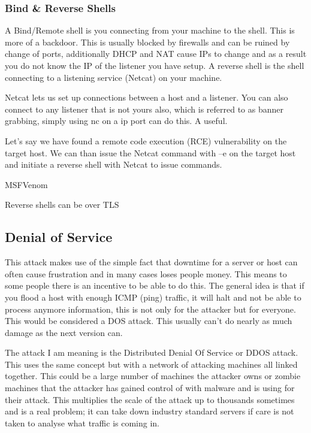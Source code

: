 \subsubsection{Bind & Reverse Shells}
A Bind/Remote shell is you connecting from your machine to the shell. This is more of a backdoor. This is usually blocked by firewalls and can be ruined by change of ports, additionally DHCP and NAT cause IPs to change and as a result you do not know the IP of the listener you have setup.
A reverse shell is the shell connecting to a listening service (Netcat) on your machine.

Netcat lets us set up connections between a host and a listener. You can also connect to any listener that is not yours also, which is referred to as banner grabbing, simply using nc on a ip port can do this. 
A useful. 

Let’s say we have found a remote code execution (RCE) vulnerability on the target host. We can than issue the Netcat command with –e on the target host and initiate a reverse shell with Netcat to issue commands.

MSFVenom

Reverse shells can be over TLS



\subsection{Denial of Service}
This attack makes use of the simple fact that downtime for a server or host can often cause frustration and in many cases loses people money. This means to some people there is an incentive to be able to do this. The general idea is that if you flood a host with enough ICMP (ping) traffic, it will halt and not be able to process anymore information, this is not only for the attacker but for everyone. This would be considered a DOS attack. 
This usually can't do nearly as much damage as the next version can. 

The attack I am meaning is the Distributed Denial Of Service or DDOS attack. This uses the same concept but with a network of attacking machines all linked together. This could be a large number of machines the attacker owns or zombie machines that the attacker has gained control of with malware and is using for their attack. This multiplies the scale of the attack up to thousands sometimes and is a real problem; it can take down industry 
standard servers if care is not taken to analyse what traffic is coming in.

